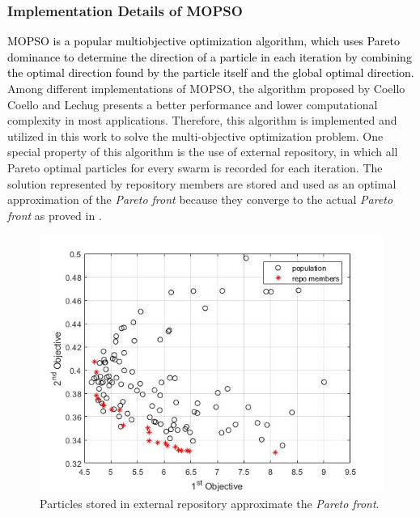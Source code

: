 \subsubsection{Implementation Details of MOPSO} %

\textcolor{black}{MOPSO is a popular multiobjective optimization algorithm, which uses Pareto dominance to determine the direction of a particle in each iteration by combining the optimal direction found by the particle itself and the global optimal direction.} Among different implementations of MOPSO, the algorithm proposed by Coello Coello and Lechug presents a better performance and lower computational complexity in most applications\cite{coello2002mopso}. Therefore, this algorithm is implemented and utilized in this work to solve the multi-objective optimization problem. One special property of this algorithm is the use of external repository, in which all Pareto optimal particles for every swarm is recorded for each iteration. The solution represented by repository members are stored and used as an optimal approximation of the \textit{Pareto front} because they converge to the actual \textit{Pareto front} as proved in \cite{coello2002mopso}. %

\begin{figure}[t]
	\centering
	\includegraphics[scale=.6]{Fig/repo_members.jpg}
	\caption{Particles stored in external repository approximate the \textit{Pareto front}.}%
		\label{fig:repo_members}
	\end{figure}

